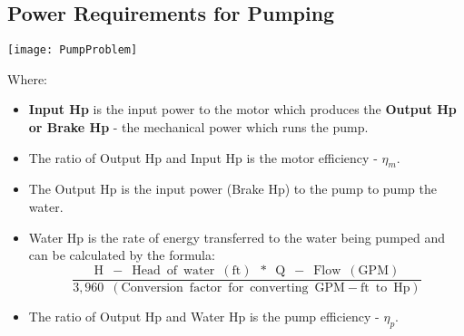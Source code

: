 \subsection{Power Requirements for Pumping}
\begin{center}
\texttt{[image: PumpProblem]}\\
\end{center}
Where:\\
\begin{itemize}
\item \textbf{Input Hp} is the input power to the motor which produces the \textbf{Output Hp or Brake Hp} - the mechanical power which runs the pump.  
\item The ratio of Output Hp and Input Hp is the motor efficiency - $\eta_m$.
\item The Output Hp is the input power (Brake Hp) to the pump to pump the water.
\item Water Hp is the rate of energy transferred to the water being pumped and can be calculated by the formula:\\
$$\dfrac{\mathrm{H \enspace - \enspace Head \enspace of \enspace water \enspace (ft) \enspace * \enspace Q \enspace - \enspace Flow \enspace (GPM)}}{3,960 \enspace \mathrm{(Conversion \enspace factor \enspace for \enspace converting \enspace GPM-ft \enspace to \enspace Hp)}}$$
\item The ratio of Output Hp and Water Hp is the pump efficiency - $\eta_p$.
\end{itemize}
